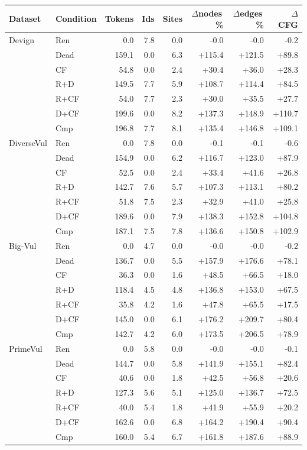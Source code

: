 \begin{tabular}{llrrrrrr}
\toprule
Dataset & Condition & Tokens & Ids & Sites & $\Delta$nodes\,\% & $\Delta$edges\,\% & $\Delta$CFG \\
\midrule
Devign & Ren & 0.0 & 7.8 & 0.0 & -0.0 & -0.0 & -0.2 \\
 & Dead & 159.1 & 0.0 & 6.3 & +115.4 & +121.5 & +89.8 \\
 & CF & 54.8 & 0.0 & 2.4 & +30.4 & +36.0 & +28.3 \\
 & R+D & 149.5 & 7.7 & 5.9 & +108.7 & +114.4 & +84.5 \\
 & R+CF & 54.0 & 7.7 & 2.3 & +30.0 & +35.5 & +27.7 \\
 & D+CF & 199.6 & 0.0 & 8.2 & +137.3 & +148.9 & +110.7 \\
 & Cmp & 196.8 & 7.7 & 8.1 & +135.4 & +146.8 & +109.1 \\
\midrule
DiverseVul & Ren & 0.0 & 7.8 & 0.0 & -0.1 & -0.1 & -0.6 \\
 & Dead & 154.9 & 0.0 & 6.2 & +116.7 & +123.0 & +87.9 \\
 & CF & 52.5 & 0.0 & 2.4 & +33.4 & +41.6 & +26.8 \\
 & R+D & 142.7 & 7.6 & 5.7 & +107.3 & +113.1 & +80.2 \\
 & R+CF & 51.8 & 7.5 & 2.3 & +32.9 & +41.0 & +25.8 \\
 & D+CF & 189.6 & 0.0 & 7.9 & +138.3 & +152.8 & +104.8 \\
 & Cmp & 187.1 & 7.5 & 7.8 & +136.6 & +150.8 & +102.9 \\
\midrule
Big-Vul & Ren & 0.0 & 4.7 & 0.0 & -0.0 & -0.0 & -0.2 \\
 & Dead & 136.7 & 0.0 & 5.5 & +157.9 & +176.6 & +78.1 \\
 & CF & 36.3 & 0.0 & 1.6 & +48.5 & +66.5 & +18.0 \\
 & R+D & 118.4 & 4.5 & 4.8 & +136.8 & +153.0 & +67.5 \\
 & R+CF & 35.8 & 4.2 & 1.6 & +47.8 & +65.5 & +17.5 \\
 & D+CF & 145.0 & 0.0 & 6.1 & +176.2 & +209.7 & +80.4 \\
 & Cmp & 142.7 & 4.2 & 6.0 & +173.5 & +206.5 & +78.9 \\
\midrule
PrimeVul & Ren & 0.0 & 5.8 & 0.0 & -0.0 & -0.0 & -0.1 \\
 & Dead & 144.7 & 0.0 & 5.8 & +141.9 & +155.1 & +82.4 \\
 & CF & 40.6 & 0.0 & 1.8 & +42.5 & +56.8 & +20.6 \\
 & R+D & 127.3 & 5.6 & 5.1 & +125.0 & +136.7 & +72.5 \\
 & R+CF & 40.0 & 5.4 & 1.8 & +41.9 & +55.9 & +20.2 \\
 & D+CF & 162.6 & 0.0 & 6.8 & +164.2 & +190.4 & +90.4 \\
 & Cmp & 160.0 & 5.4 & 6.7 & +161.8 & +187.6 & +88.9 \\
\bottomrule
\end{tabular}
